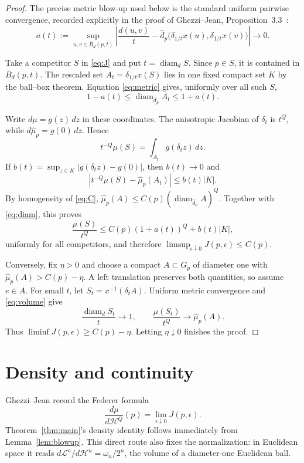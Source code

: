 \documentclass[11pt]{article}
\newcommand{\Hh}{\mathcal H}
\newcommand{\diam}{\operatorname{diam}}
\begin{document}
\begin{proof}
The precise metric blow-up used below is the standard uniform pairwise
convergence, recorded explicitly in the proof of Ghezzi--Jean,
Proposition~3.3~\cite{GJ}:
\begin{equation}\label{eq:metric}
 a(t):=\sup_{u,v\in \overline B_d(p,t)}
 \left|\frac{d(u,v)}t-
 \widehat d_p\bigl(\delta_{1/t}x(u),\delta_{1/t}x(v)\bigr)\right|
 \longrightarrow0.
\end{equation}

Take a competitor $S$ in \eqref{eq:J} and put $t=\diam_d S$.  Since $p\in
S$, it is contained in $\overline B_d(p,t)$.  The rescaled set
$A_t=\delta_{1/t}x(S)$ lies in one fixed compact set $K$ by the ball--box
theorem.  Equation \eqref{eq:metric} gives, uniformly over all such $S$,
\begin{equation}\label{eq:diam}
 1-a(t)\leq \diam_{\widehat d_p}A_t\leq1+a(t).
\end{equation}

Write $d\mu=g(z)\,dz$ in these coordinates.  The anisotropic Jacobian of
$\delta_t$ is $t^Q$, while $d\widehat\mu_p=g(0)\,dz$.  Hence
\begin{equation}\label{eq:volume}
 t^{-Q}\mu(S)=\int_{A_t}g(\delta_tz)\,dz.
\end{equation}
If $b(t)=\sup_{z\in K}|g(\delta_tz)-g(0)|$, then $b(t)\to0$ and
\[
 \left|t^{-Q}\mu(S)-\widehat\mu_p(A_t)\right|
 \leq b(t)|K|.
\]
By homogeneity of \eqref{eq:C},
$\widehat\mu_p(A)\leq C(p)(\diam_{\widehat d_p}A)^Q$.  Together with
\eqref{eq:diam}, this proves
\[
 \frac{\mu(S)}{t^Q}\leq C(p)(1+a(t))^Q+b(t)|K|,
\]
uniformly for all competitors, and therefore
$\limsup_{\epsilon\downarrow0}J(p,\epsilon)\leq C(p)$.

Conversely, fix $\eta>0$ and choose a compact $A\subset G_p$ of diameter
one with $\widehat\mu_p(A)>C(p)-\eta$.  A left translation preserves both
quantities, so assume $e\in A$.  For small $t$, let
$S_t=x^{-1}(\delta_tA)$.  Uniform metric convergence and
\eqref{eq:volume} give
\[
 \frac{\diam_d S_t}{t}\to1,
 \qquad \frac{\mu(S_t)}{t^Q}\to\widehat\mu_p(A).
\]
Thus $\liminf J(p,\epsilon)\geq C(p)-\eta$.  Letting $\eta\downarrow0$
finishes the proof.
\end{proof}

\section{Density and continuity}

Ghezzi--Jean record the Federer formula~\cite{GJ}
\begin{equation}\label{eq:Federer}
 \frac{d\mu}{d\Hh^Q}(p)=\lim_{\epsilon\downarrow0}J(p,\epsilon).
\end{equation}
Theorem~\ref{thm:main}'s density identity follows immediately from
Lemma~\ref{lem:blowup}.  This direct route also fixes the normalization: in
Euclidean space it reads $d\mathcal L^n/d\Hh^n=\omega_n/2^n$, the volume of
a diameter-one Euclidean ball.
\end{document}
